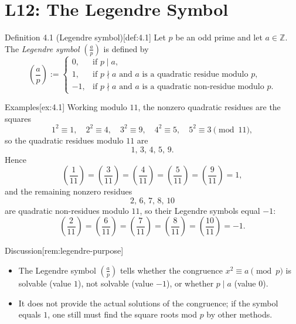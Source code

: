 \documentclass[10pt]{article}
\theoremstyle{definition}
\theoremstyle{plain}
\numberwithin{equation}{section}
\begin{document}
\section*{L12: The Legendre Symbol}

\begin{define}{Definition 4.1 (Legendre symbol)}[def:4.1]
Let $p$ be an odd prime and let $a\in\mathbb{Z}$. The \emph{Legendre symbol} $(\tfrac{a}{p})$ is defined by
\[
\left(\frac{a}{p}\right):=
\begin{cases}
0, & \text{if } p\mid a,\\[4pt]
1, & \text{if } p\nmid a\text{ and } a \text{ is a quadratic residue modulo } p,\\[4pt]
-1,& \text{if } p\nmid a\text{ and } a \text{ is a quadratic non-residue modulo } p.
\end{cases}
\]
\end{define}

\begin{define}{Examples}[ex:4.1]
Working modulo $11$, the nonzero quadratic residues are the squares
\[
1^2\equiv 1,\quad 2^2\equiv 4,\quad 3^2\equiv 9,\quad 4^2\equiv 5,\quad 5^2\equiv 3 \pmod{11},
\]
so the quadratic residues modulo $11$ are
\[
1,\,3,\,4,\,5,\,9.
\]
Hence
\[
\left(\frac{1}{11}\right)
=\left(\frac{3}{11}\right)
=\left(\frac{4}{11}\right)
=\left(\frac{5}{11}\right)
=\left(\frac{9}{11}\right)=1,
\]
and the remaining nonzero residues
\[
2,\,6,\,7,\,8,\,10
\]
are quadratic non-residues modulo $11$, so their Legendre symbols equal $-1$:
\[
\left(\frac{2}{11}\right)
=\left(\frac{6}{11}\right)
=\left(\frac{7}{11}\right)
=\left(\frac{8}{11}\right)
=\left(\frac{10}{11}\right)=-1.
\]
\end{define}

\medskip

\begin{define}{Discussion}[rem:legendre-purpose]
\begin{itemize}
  \item The Legendre symbol $\left(\frac{a}{p}\right)$ tells whether the congruence $x^2\equiv a\pmod p$
        is solvable (value $1$), not solvable (value $-1$), or whether $p\mid a$ (value $0$).
  \item It does not provide the actual solutions of the congruence; if the symbol equals $1$, one still must find the square roots mod $p$ by other methods.
\end{itemize}
\end{define}
\end{document}
